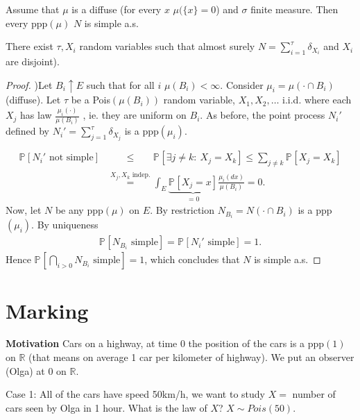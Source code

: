 \begin{theorem}[]
	Assume that $\mu $ is a diffuse (for every $x$ $\mu (\{x\}=0$) and $\sigma$ finite measure. Then every ppp$( \mu )$ $N$ is simple a.s.
\end{theorem}
\begin{rmk}[]
	There exist $\tau, X_i$ random variables such that almost surely $N= \sum_{i=1}^{\tau} \delta_{X_i}$ and $X_i$ are disjoint).
\end{rmk}
\begin{proof}
	)Let $B_i \uparrow E$ such that for all $i$ $\mu (B_i)< \infty $. Consider $\mu _i = \mu (\cdot \cap B_i)$ (diffuse). Let $\tau$ be a Pois$(\mu (B_i))$ random variable, $X_1, X_2,\ldots$ i.i.d. where each $X_j$ has law $\frac{\mu _i(\cdot)}{\mu (B_i)}$ {\color{blue}, ie. they are uniform on $B_i$}. As before, the point process $N_i'$ defined by $N_i' = \sum_{j=1}^{\tau} \delta_{X_j}$ is a ppp$(\mu _i)$. 
	\begin{align}
		\mathbb{P}_{} \left[ N_i' \textrm{ not simple} \right]  
		&\stackrel{\phantom{X_j,X_k \textrm{ indep.}}}{\leq} \mathbb{P}_{} \left[ \exists j\neq k:\ X_j = X_k \right]  \leq \sum_{j\neq k}^{} \mathbb{P}_{} \left[ X_j = X_k \right] \\ 
		&\stackrel{X_j,X_k \textrm{ indep.}}{=} \int_{E}^{} \underbrace{\mathbb{P}_{} \left[ X_j=x \right]}_{=0} \frac{\mu _i(dx)}{\mu (B_i)} = 0.
	\end{align}
	Now, let $N$ be any ppp$(\mu )$ on $E$. By restriction $N_{B_i} = N( \cdot \cap B_i)$ is a ppp$(\mu _i)$. By uniqueness 
	\begin{align}
		\mathbb{P}_{} \left[ N_{B_i} \textrm{ simple} \right]  = \mathbb{P}_{} \left[ N_i' \textrm{ simple} \right] =1.
	\end{align}
	Hence $\mathbb{P}_{} \left[ \bigcap_{i> 0} N_{B_i} \textrm{ simple} \right] =1$, which concludes that $N$ is simple a.s.	
\end{proof}

\section{Marking}
\noindent
\textbf{Motivation} Cars on a highway, at time 0 the position of the cars is a ppp$(1)$ on $\mathbb{R}$ (that means on average 1 car per kilometer of highway). We put an observer (Olga) at 0 on $\mathbb{R}$.

Case 1: All of the cars have speed 50km/h, we want to study $X=$ number of cars seen by Olga in 1 hour. What is the law of $X$? $X \sim Pois(50)$.

